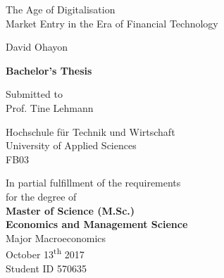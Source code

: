 \documentclass[12pt,a4paper]{article}
\begin{document}
  
  
 
 
\begin{titlepage}    
\begin{center} 

\vspace*{2cm}

{\Huge{The Age of Digitalisation}} \\
\vspace*{0.4cm} 
\LARGE{Market Entry in the Era of Financial Technology}

\vspace*{1.5cm} 

\Large{David Ohayon}\\


\vspace*{1.5cm}

\large{
\textbf{Bachelor's Thesis}\\
} 
      
\vspace*{1cm}

\large{Submitted to\\
Prof. Tine Lehmann\\}

\vspace*{1.0cm}
\large{Hochschule für Technik und Wirtschaft\\}
\large{University of Applied Sciences\\}
\large{FB03}
\vspace*{1.0cm}

\vspace*{2cm}
\small{In partial fulfillment of the requirements\\
for the degree of \\
\vspace{4mm}
\normalsize \textbf{Master of Science (M.Sc.) \\
Economics and Management Science}\\
\vspace{2mm}
Major Macroeconomics}\\
\vspace{1cm}
\large{October 13\textsuperscript{th} 2017}\\
\large{Student ID 570635}\\
      
\end{center}
\end{titlepage}
\end{document}
